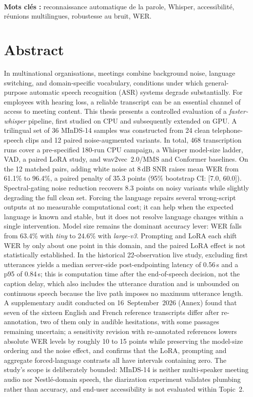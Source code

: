 \documentclass[12pt]{report}
\begin{document}
\begin{otherlanguage}{french}
\\
\textbf{Mots clés :} reconnaissance automatique de la parole, Whisper, accessibilité, réunions multilingues, robustesse au bruit, WER.
\end{otherlanguage}
\thispagestyle{fancy}
\newpage
\section*{Abstract}
{}
In multinational organisations, meetings combine background noise, language switching, and domain-specific vocabulary, conditions under which general-purpose automatic speech recognition (ASR) systems degrade substantially. For employees with hearing loss, a reliable transcript can be an essential channel of access to meeting content. This thesis presents a controlled evaluation of a \textit{faster-whisper} pipeline, first studied on CPU and subsequently extended on GPU. A trilingual set of 36 MInDS-14 samples was constructed from 24 clean telephone-speech clips and 12 paired noise-augmented variants. In total, 468 transcription runs cover a pre-specified 180-run CPU campaign, a Whisper model-size ladder, VAD, a paired LoRA study, and wav2vec~2.0/MMS and Conformer baselines. On the 12 matched pairs, adding white noise at 8\,dB SNR raises mean WER from 61.1\% to 96.4\%, a paired penalty of 35.3 points (95\% bootstrap CI: [7.0, 60.0]). Spectral-gating noise reduction recovers 8.3 points on noisy variants while slightly degrading the full clean set. Forcing the language repairs several wrong-script outputs at no measurable computational cost; it can help when the expected language is known and stable, but it does not resolve language changes within a single intervention. Model size remains the dominant accuracy lever: WER falls from 63.4\% with \textit{tiny} to 24.6\% with \textit{large-v3}. Prompting and LoRA each shift WER by only about one point in this domain, and the paired LoRA effect is not statistically established. In the historical 22-observation live study, excluding first utterances yields a median server-side post-endpointing latency of 0.56\,s and a p95 of 0.84\,s; this is computation time after the end-of-speech decision, not the caption delay, which also includes the utterance duration and is unbounded on continuous speech because the live path imposes no maximum utterance length. A supplementary audit conducted on 16~September~2026 (Annex) found that seven of the sixteen English and French reference transcripts differ after re-annotation, two of them only in audible hesitations, with some passages remaining uncertain; a sensitivity revision with re-annotated references lowers absolute WER levels by roughly 10 to 15 points while preserving the model-size ordering and the noise effect, and confirms that the LoRA, prompting and aggregate forced-language contrasts all have intervals containing zero. The study's scope is deliberately bounded: MInDS-14 is neither multi-speaker meeting audio nor Nestlé-domain speech, the diarization experiment validates plumbing rather than accuracy, and end-user accessibility is not evaluated within Topic~2.
\end{document}
